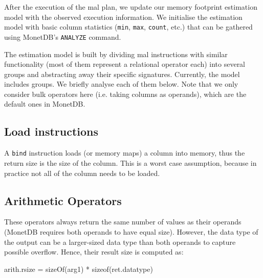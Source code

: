 \documentclass[conference]{IEEEtran}
\def\Skip{\par\medskip\nobreak\noindent}
\begin{document}
After the execution of the {\sc mal} plan, we update our memory footprint estimation model with the observed execution information.
We initialise the estimation model with basic column statistics (\texttt{\small min}, \texttt{\small max}, \texttt{\small count}, etc.) that can be gathered using MonetDB's \texttt{\small ANALYZE} command.

The estimation model is built by dividing {\sc mal} instructions with similar functionality (most of them represent a relational operator each) into several groups and abstracting away their specific signatures.
Currently, the model includes  groups.
We briefly analyse each of them below.
Note that we only consider bulk operators here (i.e. taking columns as operands), which are the default ones in MonetDB.

\subsection{Load instructions}
A \texttt{\small bind} instruction loads (or memory maps) a column into memory, thus the return size is the size of the column.
This is a worst case assumption, because in practice not all of the column needs to be loaded.

\subsection{Arithmetic Operators}
These operators always return the same number of values as their operands (MonetDB requires both operands to have equal size).
However, the data type of the output can be a larger-sized data type than both operands to capture possible overflow.
Hence, their result size is computed as:
\begin{verb}
arith.rsize = sizeOf(arg1) * sizeof(ret.datatype)
\end{verb}
\end{document}
